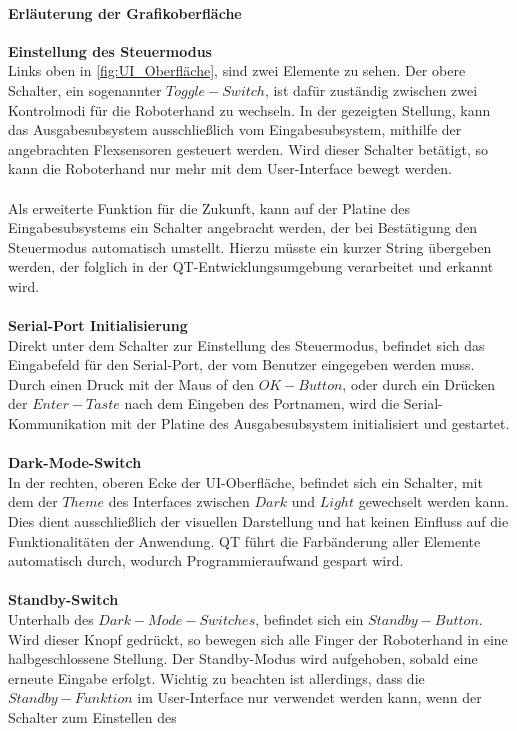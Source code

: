 \documentclass[titlepage,12pt,twoside]{article}
\begin{document}
\paragraph{Erläuterung der Grafikoberfläche}
\hfill \break
\hfill \break
\textbf{Einstellung des Steuermodus} \\
Links oben in \autoref{fig:UI_Oberfläche}, sind zwei Elemente zu sehen. Der obere Schalter, ein sogenannter $Toggle-Switch$, ist dafür zuständig
zwischen zwei Kontrolmodi für die Roboterhand zu wechseln. In der gezeigten Stellung, kann das Ausgabesubsystem ausschließlich vom Eingabesubsystem,
mithilfe der angebrachten Flexsensoren gesteuert werden. Wird dieser Schalter betätigt, so kann die Roboterhand nur mehr mit dem User-Interface
bewegt werden. \\
\\
Als erweiterte Funktion für die Zukunft, kann auf der Platine des Eingabesubsystems ein Schalter angebracht werden, der bei Bestätigung
den Steuermodus automatisch umstellt. Hierzu müsste ein kurzer String übergeben werden, der folglich in der QT-Entwicklungsumgebung verarbeitet
und erkannt wird. \\
\\
\textbf{Serial-Port Initialisierung} \\
Direkt unter dem Schalter zur Einstellung des Steuermodus, befindet sich das Eingabefeld für den Serial-Port, der vom Benutzer eingegeben werden muss. Durch 
einen Druck mit der Maus of den $OK-Button$, oder durch ein Drücken der $Enter-Taste$ nach dem Eingeben des Portnamen, wird die Serial-Kommunikation mit der Platine des Ausgabesubsystem 
initialisiert und gestartet. \\
\\
\textbf{Dark-Mode-Switch} \\
In der rechten, oberen Ecke der UI-Oberfläche, befindet sich ein Schalter, mit dem der $Theme$ des Interfaces zwischen $Dark$ und $Light$ gewechselt werden kann. Dies dient ausschließlich der 
visuellen Darstellung und hat keinen Einfluss auf die Funktionalitäten der Anwendung. QT führt die Farbänderung aller Elemente automatisch durch, wodurch Programmieraufwand gespart wird. \\
\\
\textbf{Standby-Switch} \\
Unterhalb des $Dark-Mode-Switches$, befindet sich ein $Standby-Button$. Wird dieser Knopf gedrückt, so bewegen sich alle Finger der Roboterhand in eine halbgeschlossene Stellung. Der Standby-Modus
wird aufgehoben, sobald eine erneute Eingabe erfolgt. Wichtig zu beachten ist allerdings, dass die $Standby-Funktion$ im User-Interface nur verwendet werden kann, wenn der Schalter zum Einstellen des 
\end{document}
